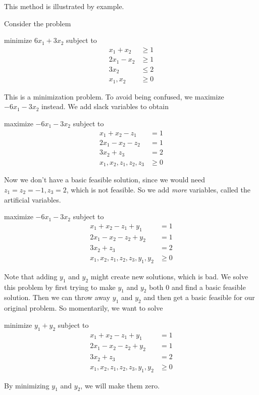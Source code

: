 \documentclass[a4paper]{article}
\begin{document}
This method is illustrated by example.
\begin{eg}
  Consider the problem
  \begin{center}
    minimize $6x_1 + 3x_2$ subject to
    \begin{align*}
      x_1 + x_2 &\geq 1\\
      2x_1 - x_2 &\geq 1\\
      3x_2 &\leq 2\\
      x_1, x_2 &\geq 0
    \end{align*}
  \end{center}
  This is a minimization problem. To avoid being confused, we maximize $-6x_1 - 3x_2$ instead. We add slack variables to obtain
  \begin{center}
    maximize $-6x_1 - 3x_2$ subject to
    \begin{align*}
      x_1 + x_2  - z_1 &= 1\\
      2x_1 - x_2 - z_2 &= 1\\
      3x_2  + z_3 &= 2\\
      x_1, x_2, z_1, z_2, z_3 &\geq 0
    \end{align*}
  \end{center}
  Now we don't have a basic feasible solution, since we would need $z_1 = z_2 = -1, z_3 = 2$, which is not feasible. So we add \emph{more} variables, called the artificial variables.
  \begin{center}
    maximize $-6x_1 - 3x_2$ subject to
    \begin{align*}
      x_1 + x_2  - z_1 + y_1&= 1\\
      2x_1 - x_2 - z_2 +y_2 &= 1\\
      3x_2  + z_3 &= 2\\
      x_1, x_2, z_1, z_2, z_3, y_1, y_2 &\geq 0
    \end{align*}
  \end{center}
  Note that adding $y_1$ and $y_2$ might create new solutions, which is bad. We solve this problem by first trying to make $y_1$ and $y_2$ both $0$ and find a basic feasible solution. Then we can throw away $y_1$ and $y_2$ and then get a basic feasible for our original problem. So momentarily, we want to solve
  \begin{center}
   minimize $y_1 + y_2$ subject to
    \begin{align*}
      x_1 + x_2  - z_1 + y_1&= 1\\
      2x_1 - x_2 - z_2 +y_2&= 1\\
      3x_2  + z_3 &= 2\\
      x_1, x_2, z_1, z_2, z_3, y_1, y_2 &\geq 0
    \end{align*}
  \end{center}
  By minimizing $y_1$ and $y_2$, we will make them zero.


\end{eg}
\end{document}
